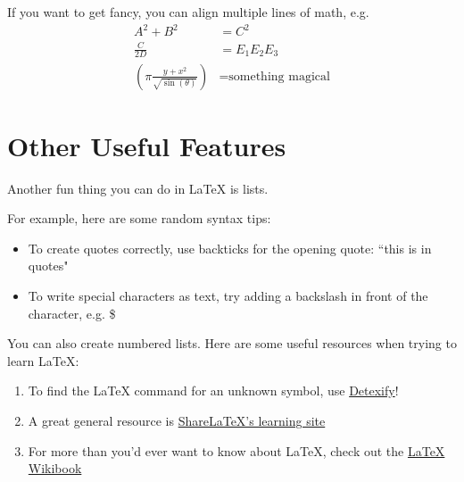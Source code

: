\documentclass[11pt]{article}
\begin{document}
If you want to get fancy, you can align multiple lines of math, e.g.
\begin{align}
A^2 +B^2 &= C^2 \\
\frac{C}{2D} &= E_1E_2E_3 \\
\left(\pi\frac{y+x^2}{\sqrt{\sin(\theta)}}\right) &= \text{something magical}
\end{align}

\section{Other Useful Features}
Another fun thing you can do in \LaTeX{} is lists.

\noindent For example, here are some random syntax tips:
\begin{itemize}
	\item To create quotes correctly, use backticks for the opening quote: ``this is in quotes"
    \item To write special characters as text, try adding a backslash in front of the character, e.g. \$
\end{itemize}

\noindent You can also create numbered lists. Here are some useful resources when trying to learn \LaTeX{}:
\begin{enumerate}
    \item To find the \LaTeX{} command for an unknown symbol, use \href{http://detexify.kirelabs.org/classify.html}{Detexify}!
	\item A great general resource is \href{https://www.sharelatex.com/learn/}{Share\LaTeX{}'s learning site}
	\item For more than you'd ever want to know about \LaTeX{}, check out the \href{http://en.wikibooks.org/wiki/LaTeX}{\LaTeX{} Wikibook}
\end{enumerate}
\end{document}

